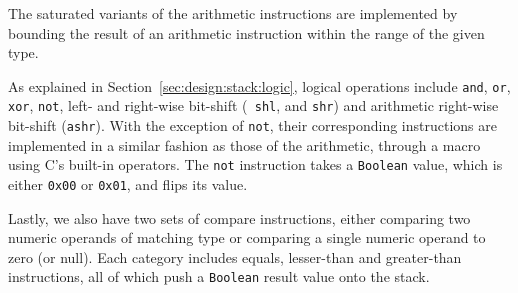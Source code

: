 The saturated variants of the arithmetic instructions are implemented by
bounding the result of an arithmetic instruction within the range of the given
type.

As explained in Section~\ref{sec:design:stack:logic}, logical operations include
{\tt and}, {\tt or}, {\tt xor}, {\tt not}, left- and right-wise bit-shift ({\tt
  shl}, and {\tt shr}) and arithmetic right-wise bit-shift ({\tt ashr}). With
the exception of {\tt not}, their corresponding instructions are implemented in
a similar fashion as those of the arithmetic, through a macro using C's built-in
operators. The {\tt not} instruction takes a {\tt Boolean} value, which is
either {\tt 0x00} or {\tt 0x01}, and flips its value.

Lastly, we also have two sets of compare instructions, either comparing two
numeric operands of matching type or comparing a single numeric operand to zero
(or null). Each category includes equals, lesser-than and greater-than
instructions, all of which push a {\tt Boolean} result value onto the stack.

